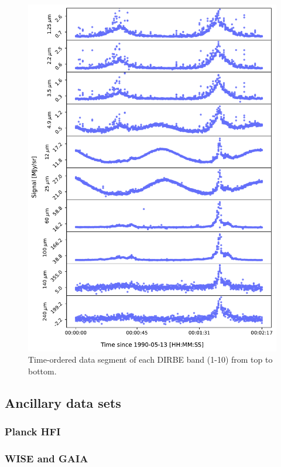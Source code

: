 \documentclass{aa}
\begin{document}
\begin{figure}
  \centering
   	\includegraphics[width=\textwidth]{figs/tod.pdf}
  	\caption{Time-ordered data segment of each DIRBE band (1-10) from top to bottom.}
	\label{fig: cios}
\end{figure}




\subsection{Ancillary data sets}

\subsubsection{Planck HFI}

\subsubsection{WISE and GAIA}
\end{document}
